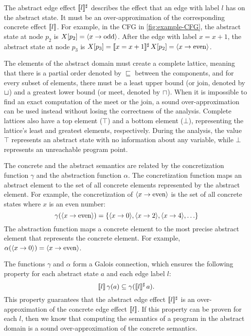 The abstract edge effect $\llbracket l\rrbracket^\sharp$ describes the effect that an edge with label $l$ has on the abstract state.
It must be an over-approximation of the corresponding concrete effect $\llbracket l\rrbracket$.
For example, in the CFG in \cref{fig:example-CFG}, the abstract state at node $p_2$ is $X[p_2] = \langle x \rightarrow \text{odd}\rangle$.
After the edge with label $x = x+1$, the abstract state at node $p_3$ is $X[p_3] = \llbracket x = x+1\rrbracket^\sharp\,X[p_2] = \langle x \rightarrow \text{even}\rangle$.

The elements of the abstract domain must create a complete lattice, meaning that there is a partial order denoted by $\sqsubseteq$ between the components, and for every subset of elements, there must be a least upper bound (or join, denoted by $\sqcup$) and a greatest lower bound (or meet, denoted by $\sqcap$).
When it is impossible to find an exact computation of the meet or the join, a sound over-approximation can be used instead without losing the correctness of the analysis.
Complete lattices also have a top element ($\top$) and a bottom element ($\bot$), representing the lattice's least and greatest elements, respectively.
During the analysis, the value $\top$ represents an abstract state with no information about any variable, while $\bot$ represents an unreachable program point.

The concrete and the abstract semantics are related by the concretization function $\gamma$ and the abstraction function $\alpha$.
The concretization function maps an abstract element to the set of all concrete elements represented by the abstract element.
For example, the concretization of $\langle x \rightarrow \text{even}\rangle$ is the set of all concrete states where $x$ is an even number:
\[
  \gamma(\langle x \rightarrow \text{even}\rangle) = \{\langle x \rightarrow 0\rangle, \langle x \rightarrow 2\rangle, \langle x \rightarrow 4\rangle,\ldots\}
\]
The abstraction function maps a concrete element to the most precise abstract element that represents the concrete element. For example, $\alpha(\langle x \rightarrow 0\rangle) = \langle x \rightarrow \text{even}\rangle$.

The functions $\gamma$ and $\alpha$ form a Galois connection, which ensures the following property for each abstract state $a$ and each edge label $l$:
\[
  \llbracket l\rrbracket\,\gamma(a) \subseteq \gamma(\llbracket l\rrbracket^\sharp\,a).
\]
This property guarantees that the abstract edge effect $\llbracket l\rrbracket^\sharp$ is an over-approximation
of the concrete edge effect $\llbracket l\rrbracket$.
If this property can be proven for each $l$, then we know that computing the semantics of a program in the abstract domain is a sound over-approximation of the concrete semantics.

